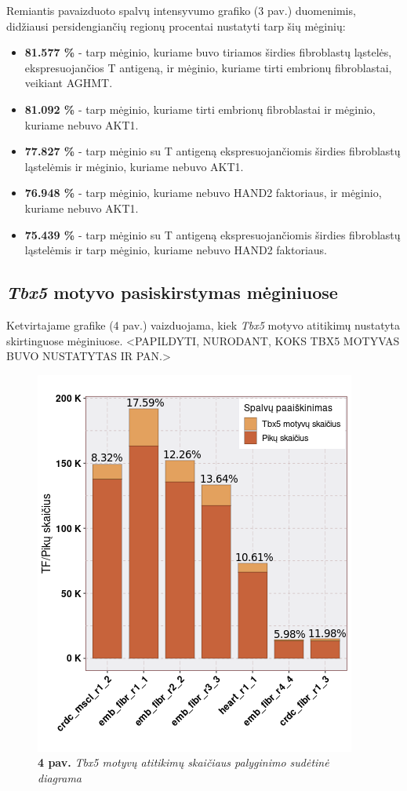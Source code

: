 \documentclass[12pt]{article}
\begin{document}
Remiantis pavaizduoto spalvų intensyvumo grafiko (3 pav.)
duomenimis, didžiausi persidengiančių regionų procentai
nustatyti tarp šių mėginių:
\begin{itemize}
    \item \textbf{81.577 \%} - tarp mėginio, kuriame buvo tiriamos širdies
            fibroblastų ląstelės, ekspresuojančios T antigeną, ir mėginio,
            kuriame tirti embrionų fibroblastai, veikiant AGHMT.
    \item \textbf{81.092 \%} - tarp mėginio, kuriame tirti embrionų
            fibroblastai ir mėginio, kuriame nebuvo AKT1.
    \item \textbf{77.827 \%} - tarp mėginio su T antigeną ekspresuojančiomis
            širdies fibroblastų ląstelėmis ir mėginio, kuriame nebuvo AKT1.
    \item \textbf{76.948 \%} - tarp mėginio, kuriame nebuvo HAND2
            faktoriaus, ir mėginio, kuriame nebuvo AKT1.
    \item \textbf{75.439 \%} - tarp mėginio su T antigeną ekspresuojančiomis
            širdies fibroblastų ląstelėmis ir tarp mėginio, kuriame nebuvo HAND2
            faktoriaus.
  \end{itemize}

\subsection{\emph{Tbx5} motyvo pasiskirstymas mėginiuose}
Ketvirtajame grafike (4 pav.) vaizduojama, kiek \emph{Tbx5}
motyvo atitikimų nustatyta skirtinguose mėginiuose.
<PAPILDYTI, NURODANT, KOKS TBX5 MOTYVAS BUVO NUSTATYTAS IR PAN.>

\begin{figure}[htb]
    \begin{center}
        \includegraphics[width=0.7\linewidth]{Figures/tf_hit_percentage.png}
        \caption*{\textbf{4 pav.} \emph{Tbx5 motyvų atitikimų skaičiaus palyginimo
                  sudėtinė diagrama}}
    \end{center}
\end{figure}
\end{document}
